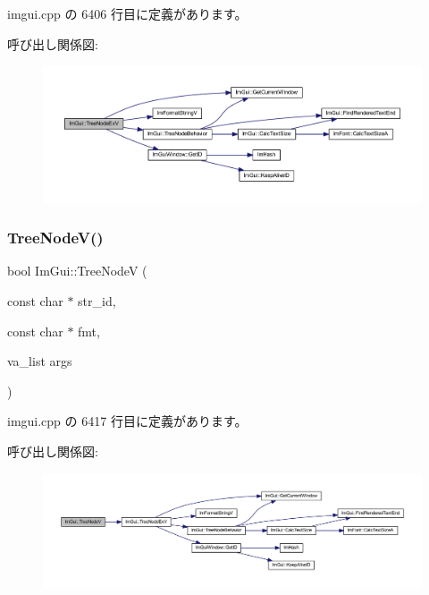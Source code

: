  imgui.\+cpp の 6406 行目に定義があります。

呼び出し関係図\+:\nopagebreak
\begin{figure}[H]
\begin{center}
\leavevmode
\includegraphics[width=350pt]{namespace_im_gui_aaae827898572d17e064a88a1afc8e6b0_cgraph}
\end{center}
\end{figure}
\mbox{\label{namespace_im_gui_a9bc1075c583973d76d8d65ea89787453}} 
\subsubsection{\texorpdfstring{Tree\+Node\+V()}{TreeNodeV()}\hspace{0.1cm}{\footnotesize\ttfamily [1/2]}}
{\footnotesize\ttfamily bool Im\+Gui\+::\+Tree\+NodeV (\begin{DoxyParamCaption}\item[{const char $\ast$}]{str\+\_\+id,  }\item[{const char $\ast$}]{fmt,  }\item[{va\+\_\+list}]{args }\end{DoxyParamCaption})}



 imgui.\+cpp の 6417 行目に定義があります。

呼び出し関係図\+:\nopagebreak
\begin{figure}[H]
\begin{center}
\leavevmode
\includegraphics[width=350pt]{namespace_im_gui_a9bc1075c583973d76d8d65ea89787453_cgraph}
\end{center}
\end{figure}
\mbox{\label{namespace_im_gui_a15320f61ba6b4916af3323bf7844602e}} 
